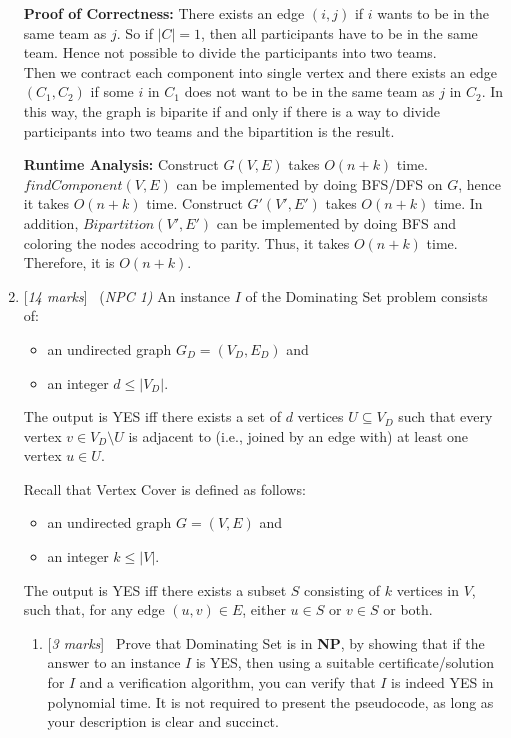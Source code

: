 \documentclass[11pt]{article}
\newcommand{\Q}[1]{\medskip\item {[{\em #1 marks\/}]}\ }
\begin{document}
\begin{enumerate}
\textbf{Proof of Correctness:} There exists an edge $(i, j)$ if $i$ wants to be in the same team as $j$. So if 
$|C| = 1$, then all participants have to be in the same team. Hence not possible to divide the participants into 
two teams.\\
Then we contract each component into single vertex and there exists an edge $(C_1, C_2)$ if some $i$ in $C_1$ 
does not want to be in the same team as $j$ in $C_2$. In this way, the graph is biparite if and only if there 
is a way to divide participants into two teams and the bipartition is the result.

\textbf{Runtime Analysis:} Construct $G(V, E)$ takes $O(n + k)$ time. $findComponent(V, E)$ can be implemented by 
doing BFS/DFS on $G$, hence it takes $O(n + k)$ time. Construct $G'(V', E')$ takes $O(n + k)$ time. In addition, 
$Bipartition(V', E')$ can be implemented by doing BFS and coloring the nodes accodring to parity. Thus, it 
takes $O(n + k)$ time. Therefore, it is $O(n + k)$.

\newpage
\Q{14} {(\em NPC 1)} An instance $I$ of the {\sc Dominating Set} problem consists of:

\begin{itemize}
\item  an undirected graph $G_D = (V_D,E_D)$ and
\item an integer $d \leq  |V_D|$.
\end{itemize}

The output is YES iff there exists a set of $d$ vertices $U \subseteq V_D$ such that
every vertex $v \in V_D \setminus U$ is adjacent to (i.e., joined by an edge with)
at least one vertex $u \in U$.

Recall that {\sc Vertex Cover} is defined as follows: 
\begin{itemize}
\item an undirected graph $G = (V,E)$ and
\item an integer $k \leq |V|$. 
\end{itemize}
The output is YES iff there exists
a subset $S$ consisting of $k$ vertices in $V$, such that, for any edge $(u, v) \in E$, either $u \in S$ or $v \in S$ or both.

\begin{enumerate}
\Q{3} Prove that {\sc Dominating Set} is in {\bf NP}, by showing that if the answer to
an instance $I$ is YES, then using a suitable certificate/solution for $I$ and a verification algorithm,
you can verify that $I$ is indeed YES in polynomial time. It is not required to present the pseudocode, as long as your description is clear and succinct.


\end{enumerate}
\end{enumerate}
\end{document}
